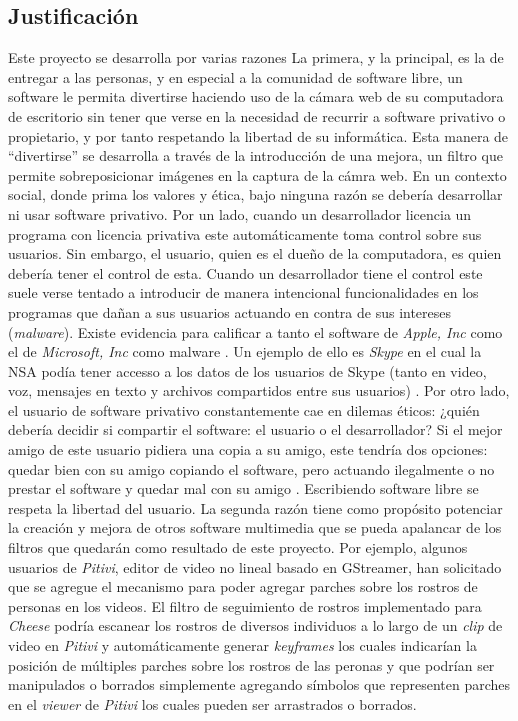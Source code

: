 \documentclass[a4paper,openright,12pt]{report}
\begin{document}
\subsection{Justificación}
Este proyecto se desarrolla por varias razones La primera, y la principal, es la
de entregar a las personas, y en especial a la comunidad de software libre, un
software le permita divertirse haciendo uso de la cámara web de su computadora
de escritorio sin tener que verse en la necesidad de recurrir a software
privativo o propietario, y por tanto respetando la libertad de su informática. Esta
manera de ``divertirse'' se desarrolla a través de la introducción de una mejora,
un filtro que permite sobreposicionar imágenes en la captura de la cámra web. En
un contexto social, donde prima los valores y ética, bajo ninguna razón se
debería desarrollar ni usar software privativo. Por un lado, cuando un
desarrollador licencia un programa con licencia privativa este automáticamente
toma control sobre sus usuarios. Sin embargo, el usuario, quien es el dueño de
la computadora, es quien debería tener el control de esta. Cuando un
desarrollador tiene el control este suele verse tentado a introducir de manera
intencional funcionalidades en los programas que dañan a sus usuarios actuando
en contra de sus intereses (\textit{malware}). Existe evidencia para calificar
a tanto el software de \textit{Apple, Inc} como el de \textit{Microsoft, Inc}
como malware \cite{malwareFSF}. Un ejemplo de ello es \textit{Skype} en
el cual la NSA podía tener accesso a los datos de los usuarios de Skype (tanto
en video, voz, mensajes en texto y archivos compartidos entre sus usuarios)
\cite{skypeMalware}.  Por otro lado, el usuario de software privativo
constantemente cae en dilemas éticos: ¿quién debería decidir si compartir el
software: el usuario o el desarrollador? Si el mejor amigo de este usuario
pidiera una copia a su amigo, este tendría dos opciones: quedar bien con su
amigo copiando el software, pero actuando ilegalmente o no prestar el software
y quedar mal con su amigo \cite{patentesRMS}. Escribiendo software libre se
respeta la libertad del usuario. La segunda razón tiene como
propósito potenciar la creación y mejora de otros software multimedia que se
pueda apalancar de los filtros que quedarán como resultado de este proyecto.
Por ejemplo, algunos usuarios de \textit{Pitivi}, editor de video no lineal
basado en GStreamer, han solicitado que se agregue el mecanismo para poder
agregar parches sobre los rostros de personas en los videos. El filtro de
seguimiento de rostros implementado para \textit{Cheese} podría escanear los
rostros de diversos individuos a lo largo de un \textit{clip} de video en
\textit{Pitivi} y automáticamente generar \textit{keyframes} los cuales
indicarían la posición de múltiples parches sobre los rostros de las peronas y
que podrían ser manipulados o borrados simplemente agregando símbolos que
representen parches en el \textit{viewer} de \textit{Pitivi} los cuales pueden
ser arrastrados o borrados.
\end{document}
